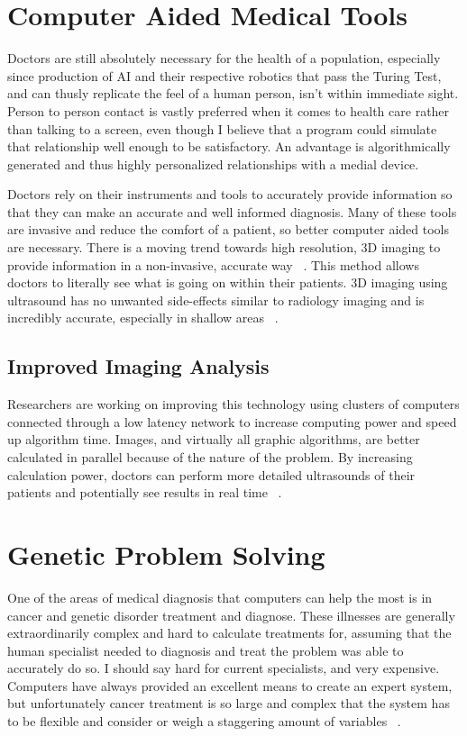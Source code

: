 \documentclass[11pt]{article}
\newcommand{\tab}{\hspace*{2em}}
\begin{document}
\begin{doublespace}
\section{Computer Aided Medical Tools}

\tab Doctors are still absolutely necessary for the health of 
a population, especially since production of AI and their respective robotics that pass the Turing Test, and can thusly replicate
the feel of a human person, isn't within immediate sight. Person to person contact is vastly preferred when it comes to health
care rather than talking to a screen, even though I believe that a program could simulate that relationship well enough to be
satisfactory. An advantage is algorithmically generated and thus highly personalized relationships with a medial device.

\tab Doctors rely on their instruments and tools to accurately provide information
so that they can make an accurate and well informed diagnosis. Many of these tools are invasive and reduce the comfort of a patient, so better computer aided tools are necessary. There is a moving trend towards high resolution, 3D imaging to
provide information in a non-invasive, accurate way ~\cite{Zhang:2002:PPU:514191.514232}. This method allows doctors to 
literally see what is going on within their patients. 3D imaging using ultrasound has no unwanted side-effects similar to 
radiology imaging and is incredibly accurate, especially in shallow areas ~\cite{Zhang:2002:PPU:514191.514232}. 

\subsection{Improved Imaging Analysis}

\tab Researchers are working on improving this technology using clusters of computers connected through a low latency network
to increase computing power and speed up algorithm time. Images, and virtually all graphic algorithms, are better calculated
in parallel because of the nature of the problem. By increasing calculation power, doctors can perform more detailed ultrasounds
of their patients and potentially see results in real time ~\cite{Zhang:2002:PPU:514191.514232}. 

\section{Genetic Problem Solving}

\tab One of the areas of medical diagnosis that computers can help the most is in cancer and genetic disorder treatment and
diagnose. These illnesses are generally extraordinarily complex and hard to calculate treatments for, assuming that the 
human specialist needed to diagnosis and treat the problem was able to accurately do so. I should say hard for current
specialists, and very expensive. Computers have always provided an excellent means to create an expert system, but unfortunately
cancer treatment is so large and complex that the system has to be flexible and consider or weigh a staggering amount of 
variables ~\cite{Wang:2012:RCM:2122263.2122454}.


\end{doublespace}
\end{document}
